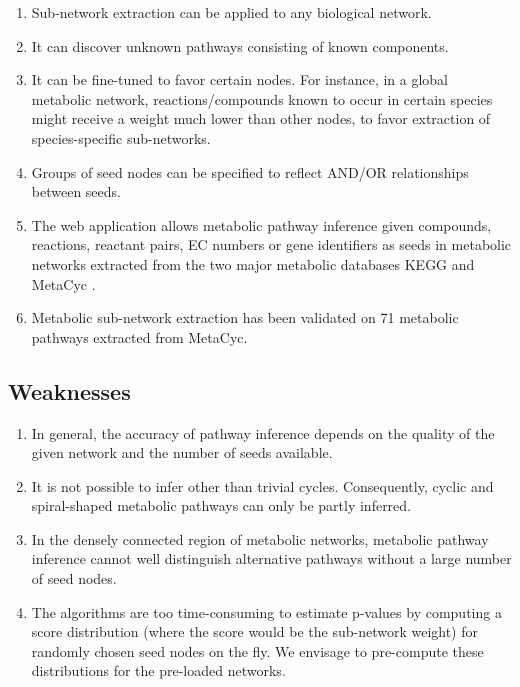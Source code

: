 \begin{enumerate}
\item Sub-network extraction can be applied to any biological network.

\item It can discover unknown pathways consisting of known components.

\item It can be fine-tuned to favor certain nodes. For instance, in a global metabolic network,
      reactions/compounds known to occur in certain species might receive a weight much lower than other nodes,
      to favor extraction of species-specific sub-networks.

\item Groups of seed nodes can be specified to reflect AND/OR relationships between seeds.

\item The web application allows metabolic pathway inference given compounds, reactions, reactant pairs, EC numbers or gene identifiers
      as seeds in metabolic networks extracted from the two major metabolic databases KEGG \cite{Kanehisa2008} and MetaCyc \cite{biocyc}.

\item Metabolic sub-network extraction has been validated on 71 metabolic pathways extracted from MetaCyc.
\end{enumerate}

\subsection{Weaknesses}

\begin{enumerate}

\item In general, the accuracy of pathway inference depends on the quality of the given network and the number of seeds available.

\item It is not possible to infer other than trivial cycles. Consequently, cyclic and spiral-shaped metabolic pathways can only be partly
inferred.

\item In the densely connected region of metabolic networks, metabolic pathway inference cannot well distinguish alternative pathways
without a large number of seed nodes.

\item The algorithms are too time-consuming to estimate p-values by computing a score distribution (where the score would be the sub-network weight)
for randomly chosen seed nodes on the fly. We envisage to pre-compute these distributions for the pre-loaded networks.

\end{enumerate}

